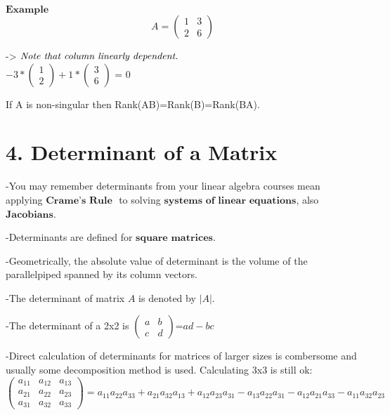 \documentclass[]{article}
\begin{document}
\(\mathbf{Example}\)\\
 \[A=\begin{pmatrix} 1 & 3 \\ 2 & 6 \end{pmatrix}\]

-\textgreater{}
\(\text{\textit{Note that column linearly dependent.}}\)\\

\(-3*\begin{pmatrix} 1 \\ 2 \end{pmatrix} + 1*\begin{pmatrix} 3 \\ 6 \end{pmatrix}\)
= 0\\

\begin{tcolorbox}[colback=green!5,colframe=blue!40!black,title=Theorem]
If A is non-singular then Rank(AB)=Rank(B)=Rank(BA). 



\end{tcolorbox}

\section{\texorpdfstring{4. Determinant of a Matrix\\
}{4. Determinant of a Matrix }}\label{determinant-of-a-matrix}

-You may remember determinants from your linear algebra courses mean
applying \(\textbf{Crame's Rule }\) to solving
\(\textbf{systems of linear equations}\), also \(\textbf{Jacobians}\).

-Determinants are defined for \(\textbf{square matrices}\).

-Geometrically, the absolute value of determinant is the volume of the
parallelpiped spanned by its column vectors.

-The determinant of matrix \(A\) is denoted by \(|A|\).

-The determinant of a 2x2 is
\(\begin{pmatrix} a & b \\ c & d \end{pmatrix}\)=\(ad-bc\)

-Direct calculation of determinants for matrices of larger sizes is
combersome and usually some decomposition method is used. Calculating
3x3 is still ok:\\[2\baselineskip]
\[\begin{pmatrix} a_{11} & a_{12} & a_{13} \\ a_{21} & a_{22} & a_{23}\\a_{31} & a_{32} & a_{33} \end{pmatrix}=a_{11}a_{22}a_{33}+a_{21}a_{32}a_{13}+a_{12}a_{23}a_{31}-a_{13}a_{22}a_{31}-a_{12}a_{21}a_{33}-a_{11}a_{32}a_{23}\]\\
\end{document}
